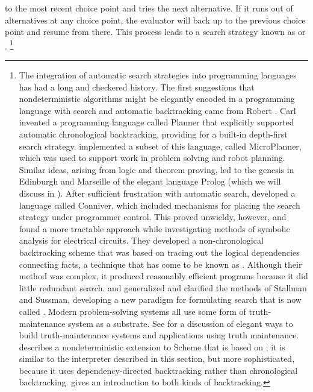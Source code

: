  to the most recent choice point and tries the next alternative.
If it runs out of alternatives at any choice point, the evaluator will back up to the previous choice point and resume from there.
This process leads to a search strategy known as  or .%
\footnote{
	The integration of automatic search strategies into programming languages has had a long and checkered history.
	The first suggestions that nondeterministic algorithms might be elegantly encoded in a programming language with search and automatic backtracking came from Robert .
	Carl  invented a programming language called Planner that explicitly supported automatic chronological backtracking, providing for a built-in depth-first search strategy.
	 implemented a subset of this language, called MicroPlanner, which was used to support work in problem solving and robot planning.
	Similar ideas, arising from logic and theorem proving, led to the genesis in Edinburgh and Marseille of the elegant language Prolog (which we will discuss in ).
	After sufficient frustration with automatic search,  developed a language called Conniver, which included mechanisms for placing the search strategy under programmer control.
	This proved unwieldy, however, and  found a more tractable approach while investigating methods of symbolic analysis for electrical circuits.
	They developed a non-chronological backtracking scheme that was based on tracing out the logical dependencies connecting facts, a technique that has come to be known as .
	Although their method was complex, it produced reasonably efficient programs because it did little redundant search.
	 and  generalized and clarified the methods of Stallman and Sussman, developing a new paradigm for formulating search that is now called .
	Modern problem-solving systems all use some form of truth-maintenance system as a substrate.
	See  for a discussion of elegant ways to build truth-maintenance systems and applications using truth maintenance.
	 describes a nondeterministic extension to Scheme that is based on ;
	it is similar to the interpreter described in this section, but more sophisticated, because it uses dependency-directed backtracking rather than chronological backtracking.
	 gives an introduction to both kinds of backtracking.
}



